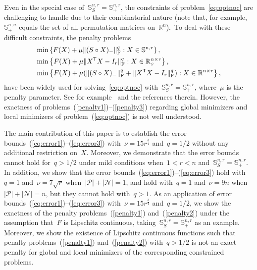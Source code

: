 \documentclass[11pt,a4paper]{article}  %
\theoremstyle{definition}
\newcommand{\RR}{\mathbb{R}}
\newcommand{\penpar}{\mu}
\newcommand{\col}{r}
\newcommand{\stf}[1]{\mathbb{S}^{#1}}
\newcommand{\fro}{{\scriptstyle{\textnormal{F}}}}
\newcommand{\trs}{{\scriptstyle{\mathsf{T}}}}
\newcommand{\tsign}{{\scriptscriptstyle{S}}}
\newcommand{\posset}{\mathcal{P}}
\newcommand{\negset}{\mathcal{N}}
\newcommand{\hp}{\circ}
\begin{document}
Even in the special case of~$\stf{n,\col}_\tsign\!\!= \stf{n,\col}_+$, the constraints of
problem~\eqref{eq:optnoc} are challenging to handle due to their combinatorial nature
(note that, for example,~$\stf{n,n}_+$ equals the set of all permutation matrices on~$\RR^n$).~To
deal with these difficult constraints, the penalty problems
 \begin{align}
    \label{penalty1}
    \min & \left\{F(X) + \penpar \|(S\hp X)_{-}\|_\fro^q \mathrel{:} X \in \stf{n,\col} \right\},\\
    \label{penalty2}
    \min & \left\{F(X) + \penpar\|X^\trs X-I_\col\|_\fro^q \mathrel{:} X \in \RR^{n\times \col}_\tsign\right\},\\
    \label{penalty3}
    \min  & \left\{F(X) + \penpar(\|(S\hp X)_{-}\|_\fro^{q}+ \|X^\trs X-I_\col\|_\fro^{q}) \mathrel{:} X \in \RR^{n\times \col}\right\},
\end{align}
have been widely used for solving~\eqref{eq:optnoc} with~$\stf{n,\col}_\tsign\!\!=\stf{n,\col}_+$,
where~$\penpar$ is the penalty parameter.
See for example~\mbox{\cite{Ahookhosh_etal_2021,Qian_Pan_Xiao_2023,Yang_etal_2012,Zass_Shashua_2006}}
and the references therein.
However, the exactness of
problems~\mbox{(\ref{penalty1})--(\ref{penalty3})} regarding global minimizers and local minimizers of
problem~(\ref{eq:optnoc}) is not well understood.


The main contribution of this paper is to establish
the error bounds~\mbox{(\ref{eq:error1})--(\ref{eq:error3})} with~$\nu = 15\col^{\frac{3}{4}}$
and~$q={1}/{2}$ without any additional restriction on~$X$.
Moreover, we demonstrate that the error bounds cannot hold for~$q>{1} /{2}$ under mild conditions
when~$1 < \col < n$ and~$\stf{n,\col}_\tsign=\stf{n,\col}_+$.
In addition, we show that the error bounds~(\ref{eq:error1})--(\ref{eq:error3}) hold
with~$q=1$ and~$\nu = 7\sqrt{\col}$ when~$|\posset|+|\negset| = 1$, and hold with~$q = 1$ and~$\nu = 9n$ when~$|\posset|+|\negset|=n$,
but they cannot hold with~$q>1$.
As an application of error bounds~\mbox{(\ref{eq:error1})--(\ref{eq:error3})} with~$\nu = 15\col^{\frac{3}{4}}$
and~$q={1}/{2}$, we show the exactness of the
penalty problems~(\ref{penalty1}) and~(\ref{penalty2}) under the assumption that~$F$ is Lipschitz
continuous, taking~$\stf{n,\col}_\tsign = \stf{n, \col}_+$ as an example. Moreover, we show the
existence of Lipschitz continuous functions such that  penalty problems~(\ref{penalty1})
and~(\ref{penalty2}) with~$q>1/2$ is not an exact penalty for global and local minimizers of the corresponding constrained problems.
\end{document}
